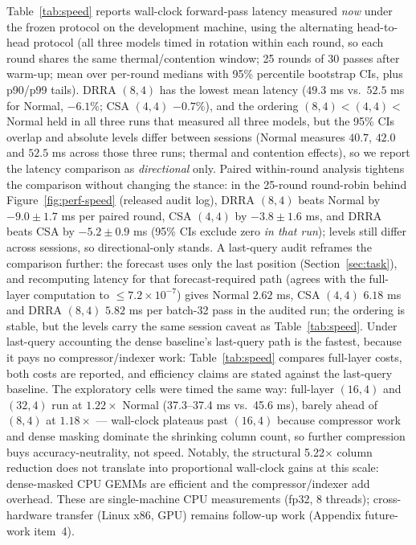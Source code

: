 Table~\ref{tab:speed} reports wall-clock forward-pass latency measured
\emph{now} under the frozen protocol on the development machine, using the
alternating head-to-head protocol (all three models timed in rotation within
each round, so each round shares the same thermal/contention window; 25
rounds of 30 passes after warm-up; mean over per-round medians with 95\%
percentile bootstrap CIs, plus p90/p99 tails). DRRA $(8,4)$ has the lowest
mean latency ($49.3$ ms vs.\ $52.5$ ms for Normal, $-6.1\%$; CSA $(4,4)$
$-0.7\%$), and the ordering $(8,4) < (4,4) <$ Normal held in all three runs
that measured all three models, but the 95\% CIs overlap and absolute levels
differ between sessions (Normal measures $40.7$, $42.0$ and $52.5$ ms across
those three runs; thermal and contention effects), so we report the latency
comparison as \emph{directional} only. Paired within-round analysis tightens
the comparison without changing the stance: in the 25-round round-robin behind
Figure~\ref{fig:perf-speed} (released audit log), DRRA $(8,4)$ beats Normal by
$-9.0 \pm 1.7$ ms per paired round, CSA $(4,4)$ by $-3.8 \pm 1.6$ ms, and
DRRA beats CSA by $-5.2 \pm 0.9$ ms (95\% CIs exclude zero \emph{in that
run}); levels still differ across sessions, so directional-only stands. A last-query audit reframes
the comparison further: the forecast uses only the last position (Section~\ref{sec:task}),
and recomputing latency for that forecast-required path (agrees with the full-layer computation to $\le 7.2\times10^{-7}$)
gives Normal $2.62$ ms, CSA $(4,4)$ $6.18$ ms and DRRA $(8,4)$ $5.82$ ms per
batch-32 pass in the audited run; the ordering is stable, but the levels carry
the same session caveat as Table~\ref{tab:speed}. Under last-query accounting
the dense baseline's last-query path is the fastest, because it pays no
compressor/indexer work: Table~\ref{tab:speed} compares full-layer costs, both costs are
reported, and efficiency claims are stated against the last-query baseline. The exploratory
cells were timed the same way: full-layer $(16,4)$ and $(32,4)$ run at $1.22\times$ Normal
(37.3--37.4 ms vs.\ 45.6 ms), barely ahead of $(8,4)$ at $1.18\times$ --- wall-clock plateaus
past $(16,4)$ because compressor work and dense masking dominate the shrinking column
count, so further compression buys accuracy-neutrality, not speed. Notably, the structural
5.22$\times$ column reduction does not translate into proportional wall-clock
gains at this scale: dense-masked CPU GEMMs are efficient and the
compressor/indexer add overhead. These are single-machine CPU measurements
(fp32, 8 threads); cross-hardware transfer (Linux x86, GPU) remains
follow-up work (Appendix future-work item~4).

